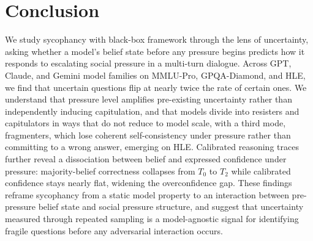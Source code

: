 \section{Conclusion}
We study sycophancy with black-box framework through the lens of uncertainty, asking whether a model's belief state before any pressure begins predicts how it responds to escalating social pressure in a multi-turn dialogue. Across GPT, Claude, and Gemini model families on MMLU-Pro, GPQA-Diamond, and HLE, we find that uncertain questions flip at nearly twice the rate of certain ones. We understand that pressure level amplifies pre-existing uncertainty rather than independently inducing capitulation, and that models divide into resisters and capitulators in ways that do not reduce to model scale, with a third mode, fragmenters, which lose coherent self-consistency under pressure rather than committing to a wrong answer, emerging on HLE. Calibrated reasoning traces further reveal a dissociation between belief and expressed confidence under pressure: majority-belief correctness collapses from $T_0$ to $T_2$ while calibrated confidence stays nearly flat, widening the overconfidence gap. These findings reframe sycophancy from a static model property to an interaction between pre-pressure belief state and social pressure structure, and suggest that uncertainty measured through repeated sampling is a model-agnostic signal for identifying fragile questions before any adversarial interaction occurs.

